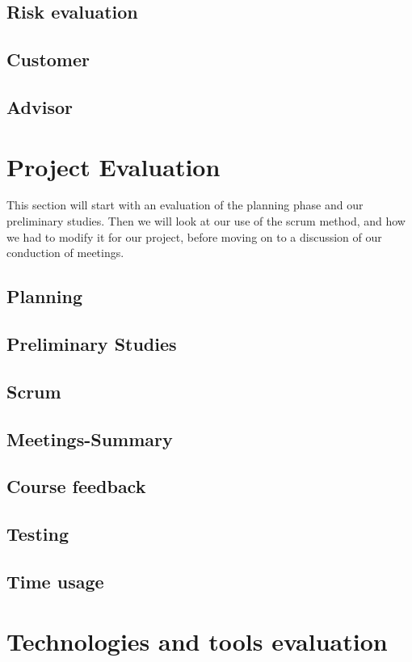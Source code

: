 \subsection{Risk evaluation}
\subsection{Customer} 
\subsection{Advisor}
\section{Project Evaluation}
This section will start with an evaluation of the planning phase and our preliminary studies.  
Then we will look at our use of the scrum method, and how we had to modify it for our project, before moving on to a discussion of our conduction of meetings. 
\subsection{Planning}
\subsection{Preliminary Studies}
\subsection{Scrum}
\subsection{Meetings-Summary}
\subsection{Course feedback}
\subsection{Testing}
\subsection{Time usage}
\section{Technologies and tools evaluation}
